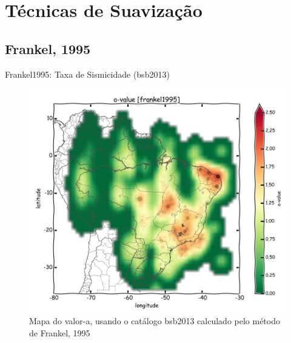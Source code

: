 \documentclass[ucs,8pt]{beamer}
\begin{document}
\section{Técnicas de Suavização}

\subsection{Frankel, 1995}

\begin{frame}{Frankel1995: Taxa de Sismicidade (\gls{bsb2013})}
\begin{figure}[H]
  \centering
  \includegraphics[height=.95\textheight]{a_frankel_br} 
  \caption{Mapa do valor-a, usando o catálogo \gls{bsb2013} calculado pelo método de Frankel, 1995 }
  \label{fig:a_fran_br} 
\end{figure}
\end{frame}
\end{document}
